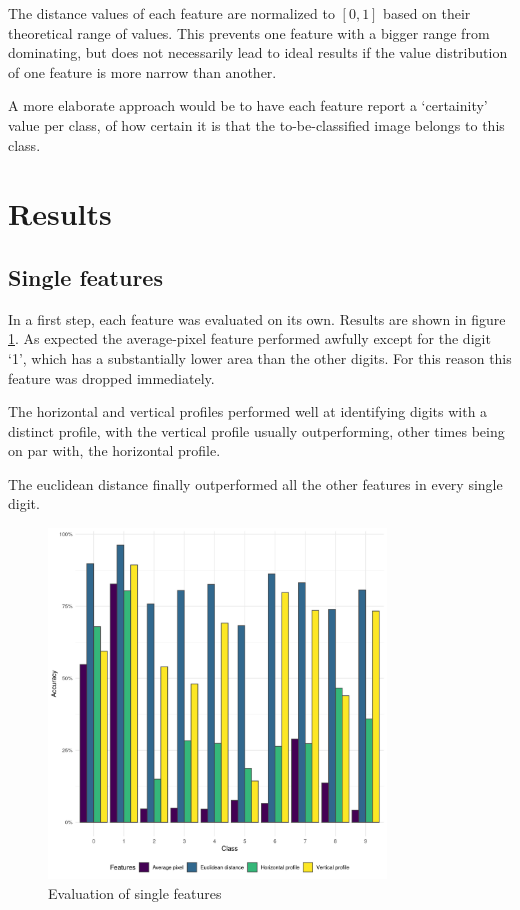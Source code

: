 \documentclass[a4paper]{scrreprt}
\begin{document}
The distance values of each feature are normalized to $[0, 1]$ based on their
theoretical range of values. This prevents one feature with a bigger range from
dominating, but does not necessarily lead to ideal results if the value
distribution of one feature is more narrow than another.

A more elaborate approach would be to have each feature report a `certainity'
value per class, of how certain it is that the to-be-classified image belongs
to this class.

\section{Results}

\subsection{Single features}

In a first step, each feature was evaluated on its own. Results are shown in
figure \ref{fig:evaluation_single}. As expected the average-pixel feature
performed awfully except for the digit `1', which has a substantially lower
area than the other digits. For this reason this feature was dropped
immediately.

The horizontal and vertical profiles performed well at identifying digits with
a distinct profile, with the vertical profile usually outperforming, other
times being on par with, the horizontal profile.

The euclidean distance finally outperformed all the other features in every
single digit.

\begin{figure}[h]
        \centering
		\includegraphics[width=0.8\textwidth]{resources/features_single.png}
		\caption{Evaluation of single features}
		\label{fig:evaluation_single}
\end{figure}
\end{document}
